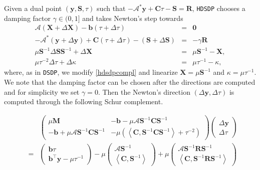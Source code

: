 Given a dual point $\left( \mathbf{y}, \mathbf{S}, \tau \right)$ such that $- \mathcal{A}^{\ast} \mathbf{y} +
\mathbf{C} \tau - \mathbf{S} = \mathbf{R}$, {{\texttt{HDSDP}}} chooses a damping factor $\gamma \in
(0, 1]$ and takes Newton's step towards
\begin{eqnarray*}
  \mathcal{A} \left( \mathbf{X} + \Delta \mathbf{X} \right) - \mathbf{b} (\tau + \Delta \tau) & = & \textbf{0}\\
  -\mathcal{A}^{\ast} \left( \mathbf{y} + \Delta \mathbf{y} \right) + \mathbf{C} (\tau + \Delta \tau)
  - \left( \mathbf{S} + \Delta \mathbf{S} \right) & = & - \gamma \mathbf{R}\\
  \mu \mathbf{S}^{- 1} \Delta \mathbf{S} \mathbf{S}^{- 1} + \Delta \mathbf{X} & = & \mu \mathbf{S}^{- 1} - \mathbf{X},\\
  \mu \tau^{- 2} \Delta \tau + \Delta \kappa & = & \mu \tau^{- 1} - \kappa,
\end{eqnarray*}
where, as in {{\texttt{DSDP}}}, we modify \eqref{hdsdpcompl} and linearize $\mathbf{X} = \mu \mathbf{S}^{- 1}$ and $\kappa
= \mu \tau^{- 1}$. We note that the damping factor can be chosen after the
directions are computed and for simplicity we set $\gamma = 0$. Then the
Newton's direction $\left( \Delta \mathbf{y}, \Delta \tau \right)$ is computed through
the following Schur complement.

\begin{eqnarray}
  &  & \left(\begin{array}{cc}
    \mu \mathbf{M} & - \mathbf{b} - \mu \mathcal{A} \mathbf{S}^{- 1} \mathbf{C} \mathbf{S}^{- 1}\\
    - \mathbf{b} + \mu \mathcal{A} \mathbf{S}^{- 1} \mathbf{C} \mathbf{S}^{- 1} & - \mu \left(
    \left\langle \mathbf{C}, \mathbf{S}^{- 1} \mathbf{C} \mathbf{S}^{- 1} \right\rangle + \tau^{- 2} \right)
  \end{array}\right) \left(\begin{array}{c}
    \Delta \mathbf{y}\\
    \Delta \tau
  \end{array}\right)\\ \nonumber
  & = & \left(\begin{array}{c}
    \mathbf{b} \tau\\
    \mathbf{b}^{\top} \mathbf{y} - \mu \tau^{- 1}
  \end{array}\right) - \mu \left(\begin{array}{c}
    \mathcal{A} \mathbf{S}^{- 1}\\
    \left\langle \mathbf{C}, \mathbf{S}^{- 1} \right\rangle
  \end{array}\right) + \mu \left(\begin{array}{c}
    \mathcal{A} \mathbf{S}^{- 1} \mathbf{R} \mathbf{S}^{- 1}\\
    \left\langle \mathbf{C}, \mathbf{S}^{- 1} \mathbf{R} \mathbf{S}^{- 1} \right\rangle
  \end{array}\right) \\ \nonumber
\end{eqnarray}


